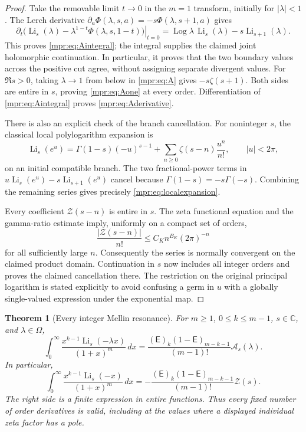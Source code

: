 \documentclass[11pt,letterpaper]{article}
\numberwithin{equation}{section}
\newtheorem{theorem}{Theorem}[section]
\theoremstyle{definition}
\theoremstyle{remark}
\begin{document}
\begin{proof}
Take the removable limit $t\to0$ in the $m=1$ transform, initially for
$|\lambda|<1$.  The Lerch derivative
$\partial_a\Phi(\lambda,s,a)=-s\Phi(\lambda,s+1,a)$ gives
\[
 \left.\partial_t
       \bigl(\operatorname{Li}_s(\lambda)
             -\lambda^{1-t}\Phi(\lambda,s,1-t)\bigr)\right|_{t=0}
 =\operatorname{Log}\lambda\,\operatorname{Li}_s(\lambda)
                         -s\operatorname{Li}_{s+1}(\lambda).
\]
This proves \eqref{mpr:eq:Aintegral}; the integral supplies the claimed
joint holomorphic continuation.  In particular, it proves that the two
boundary values across the positive cut agree, without assigning separate
divergent values.  For $\Re s>0$, taking $\lambda\to1$ from below in
\eqref{mpr:eq:A} gives $-s\zeta(s+1)$.  Both sides are entire in $s$,
proving \eqref{mpr:eq:Aone} at every order.  Differentiation of
\eqref{mpr:eq:Aintegral} proves \eqref{mpr:eq:Aderivative}.

There is also an explicit check of the branch cancellation.  For
noninteger $s$, the classical local polylogarithm expansion
\cite[Eq.~25.12.12]{DLMFPolylog} is
\[
 \operatorname{Li}_s(e^u)
  =\Gamma(1-s)(-u)^{s-1}
      +\sum_{n\ge0}\zeta(s-n)\frac{u^n}{n!},\qquad |u|<2\pi,
\]
on an initial compatible branch.  The two fractional-power terms in
$u\operatorname{Li}_s(e^u)-s\operatorname{Li}_{s+1}(e^u)$ cancel
because $\Gamma(1-s)=-s\Gamma(-s)$.  Combining the remaining series
gives precisely \eqref{mpr:eq:localexpansion}.

Every coefficient $\mathscr Z(s-n)$ is entire in $s$.  The zeta
functional equation and the gamma-ratio estimate imply, uniformly on a
compact set of orders,
\[
 \frac{|\mathscr Z(s-n)|}{n!}
        \le C_K n^{B_K}(2\pi)^{-n}
\]
for all sufficiently large $n$.  Consequently the series is normally
convergent on the claimed product domain.  Continuation in $s$ now
includes all integer orders and proves the claimed cancellation there.
The restriction on the original principal logarithm is stated explicitly
to avoid confusing a germ in $u$ with a globally single-valued expression
under the exponential map.
\end{proof}

\begin{theorem}[Every integer Mellin resonance]\label{mpr:thm:integer}
For $m\ge1$, $0\le k\le m-1$, $s\in\mathbb C$, and $\lambda\in\Omega$,
\begin{equation}\label{mpr:eq:integer}
 \boxed{\displaystyle
 \int_0^\infty\frac{x^{k-1}\operatorname{Li}_s(-\lambda x)}{(1+x)^m}\,dx
 =\frac{(\mathsf E)_k(1-\mathsf E)_{m-k-1}}{(m-1)!}
                                  \mathcal A_s(\lambda).}
\end{equation}
In particular,
\begin{equation}\label{mpr:eq:integerzeta}
 \int_0^\infty\frac{x^{k-1}\operatorname{Li}_s(-x)}{(1+x)^m}\,dx
 =-\frac{(\mathsf E)_k(1-\mathsf E)_{m-k-1}}{(m-1)!}
                                  \mathscr Z(s).
\end{equation}
The right side is a finite expression in entire functions.  Thus every
fixed number of order derivatives is valid, including at the values
where a displayed individual zeta factor has a pole.
\end{theorem}
\end{document}
